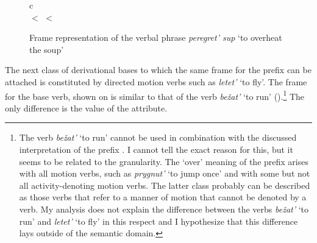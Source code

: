 \begin{figure}[p]
\begin{tabular}{c}
\\
 $<$  $<$ 
\end{tabular}
\caption{Frame representation of the verbal phrase \textit{peregret' sup} `to overheat the soup' \label{frame:pere:gret:soup}}
\end{figure}

The next class of derivational bases to which the same frame for the prefix  can be attached is constituted by directed motion verbs such as \textit{letet'} `to fly'. The frame for the base verb, shown on  is similar to that of the verb \textit{be\v{z}at'} `to run' ().\footnote{The verb \textit{be\v{z}at'} `to run' cannot be used in combination with the discussed interpretation of the prefix . I cannot tell the exact reason for this, but it seems to be related to the granularity. The `over' meaning of the prefix  arises with all  motion verbs, such as \textit{prygnut'} `to jump once' and with some but not all activity-denoting motion verbs. The latter class probably can be described as those verbs that refer to a manner of motion that cannot be denoted by a  verb. My analysis does not explain the difference between the verbs \textit{be\v{z}at'} `to run' and \textit{letet'} `to fly' in this respect and I hypothesize that this difference lays outside of the semantic domain. } The only difference is the value of the \MANN attribute.

